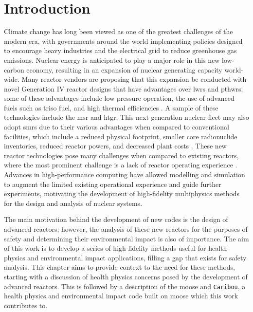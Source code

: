 \chapter{Introduction} 
\label{introduction}

Climate change has long been viewed as one of the greatest challenges of the modern era, with governments around the world implementing policies designed to encourage heavy industries and the electrical grid to reduce greenhouse gas emissions. Nuclear energy is anticipated to play a major role in this new low-carbon economy, resulting in an expansion of nuclear generating capacity world-wide. Many reactor vendors are proposing that this expansion be conducted with novel Generation IV reactor designs that have advantages over \acrfull{lwrs} and \acrfull{pthwrs}; some of these advantages include low pressure operation, the use of advanced fuels such as \acrfull{triso} fuel, and high thermal efficiencies \cite{gen_iv_2022_annual_report}. A sample of these technologies include the \acrfull{msr} and \acrfull{htgr}. This next generation nuclear fleet may also adopt \acrfull{smrs} due to their various advantages when compared to conventional facilities, which include a reduced physical footprint, smaller core radionuclide inventories, reduced reactor powers, and decreased plant costs \cite{iaea_2021_fast_reactors, nea_2021_smr_opportunities_challenges}. These new reactor technologies pose many challenges when compared to existing reactors, where the most prominent challenge is a lack of reactor operating experience \cite{iaea_2022_lessons_learned}. Advances in high-performance computing have allowed modelling and simulation to augment the limited existing operational experience and guide further experiments, motivating the development of high-fidelity multiphysics methods for the design and analysis of nuclear systems. 

The main motivation behind the development of new codes is the design of advanced reactors; however, the analysis of these new reactors for the purposes of safety and determining their environmental impact is also of importance. The aim of this work is to develop a series of high-fidelity methods useful for health physics and environmental impact applications, filling a gap that exists for safety analysis. This chapter aims to provide context to the need for these methods, starting with a discussion of health physics concerns posed by the development of advanced reactors. This is followed by a description of the \acrfull{moose} and \texttt{Caribou}, a health physics and environmental impact code built on \acrshort{moose} which this work contributes to.

